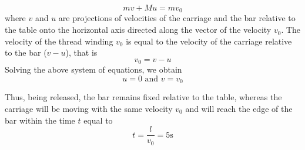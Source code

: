 \documentclass[12pt,a4paper]{book}
\begin{document}
	\begin{equation*}
		mv+Mu=mv_0
	\end{equation*}
	where $v$ and $u$ are projections of velocities of the carriage and the bar relative to the table onto the horizontal axis directed along the vector of the velocity $v_0$. The velocity of the thread winding $v_0$ is equal to the velocity of the carriage relative to the bar ($v-u$), that is
	\begin{equation*}
		v_0=v-u
	\end{equation*}
	Solving the above system of equations, we obtain
	\begin{equation*}
		u=0\text{ and }v=v_0
	\end{equation*}\par
	Thus, being released, the bar remains fixed relative to the table, whereas the carriage will be moving with the same velocity $v_0$ and will reach the edge of the bar within the time $t$ equal to
	\begin{equation*}
		t=\frac{l}{v_0}=5\text{s}
	\end{equation*}
\end{document}

